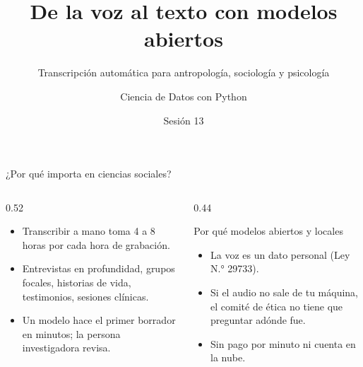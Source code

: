\documentclass[aspectratio=169,11pt]{beamer}
\title{De la voz al texto con modelos abiertos}
\subtitle{Transcripción automática para antropología, sociología y psicología}
\author{Ciencia de Datos con Python}
\institute{Universidad del Pacífico · Departamento de Economía}
\date{Sesión 13}
\begin{document}
\begin{frame}
  \titlepage
\end{frame}

\begin{frame}{¿Por qué importa en ciencias sociales?}
  \begin{columns}[T]
    \begin{column}{0.52\textwidth}
      \begin{itemize}
        \item Transcribir a mano toma \alert{4 a 8 horas por cada hora} de grabación.
        \item Entrevistas en profundidad, grupos focales, historias de vida, testimonios, sesiones clínicas.
        \item Un modelo hace el \alert{primer borrador} en minutos; la persona investigadora revisa.
      \end{itemize}
    \end{column}
    \begin{column}{0.44\textwidth}
      \begin{block}{Por qué modelos abiertos y locales}
        \begin{itemize}
          \item La voz es un dato personal (Ley N.° 29733).
          \item Si el audio no sale de tu máquina, el comité de ética no tiene que preguntar adónde fue.
          \item Sin pago por minuto ni cuenta en la nube.
        \end{itemize}
      \end{block}
    \end{column}
  \end{columns}
\end{frame}
\end{document}
